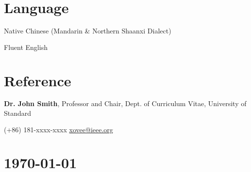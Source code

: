 \documentclass{article}
\begin{document}








\section*{Language}
\indent

Native Chinese (Mandarin \& Northern Shaanxi Dialect)

Fluent English




\section*{Reference}
\indent

\textbf{Dr. John Smith}, Professor and Chair, Dept. of Curriculum Vitae, University of Standard

\hspace{2em}(+86) 181-xxxx-xxxx \hspace{2em} \url{xovee@ieee.org}


\vfill

\section*{\hfill\color{OliveGreen}\today}
\end{document}
